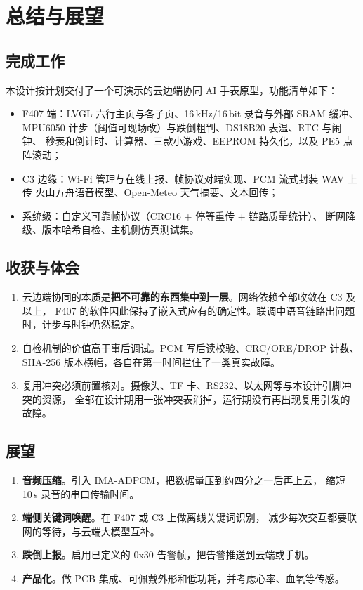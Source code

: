 \section{总结与展望}

\subsection{完成工作}
本设计按计划交付了一个可演示的云边端协同 AI 手表原型，功能清单如下：
\begin{itemize}
  \item F407 端：LVGL 六行主页与各子页、16\,kHz/16\,bit 录音与外部 SRAM 缓冲、
        MPU6050 计步（阈值可现场改）与跌倒粗判、DS18B20 表温、RTC 与闹钟、
        秒表和倒计时、计算器、三款小游戏、EEPROM 持久化，以及 PE5 点阵滚动；
  \item C3 边缘：Wi-Fi 管理与在线上报、帧协议对端实现、PCM 流式封装 WAV 上传
        火山方舟语音模型、Open-Meteo 天气摘要、文本回传；
  \item 系统级：自定义可靠帧协议（CRC16 + 停等重传 + 链路质量统计）、
        断网降级、版本哈希自检、主机侧仿真测试集。
\end{itemize}


\subsection{收获与体会}
\begin{enumerate}[label=（\arabic*）]
\item 云边端协同的本质是\textbf{把不可靠的东西集中到一层}。网络依赖全部收敛在 C3 及以上，
F407 的软件因此保持了嵌入式应有的确定性。联调中语音链路出问题时，计步与时钟仍然稳定。
\item 自检机制的价值高于事后调试。PCM 写后读校验、CRC/ORE/DROP 计数、
SHA-256 版本横幅，各自在第一时间拦住了一类真实故障。
\item 复用冲突必须前置核对。摄像头、TF 卡、RS232、以太网等与本设计引脚冲突的资源，
全部在设计期用一张冲突表消掉，运行期没有再出现复用引发的故障。
\end{enumerate}

\subsection{展望}
\begin{enumerate}[label=（\arabic*）]
\item \textbf{音频压缩}。引入 IMA-ADPCM，把数据量压到约四分之一后再上云，
缩短 10\,s 录音的串口传输时间。
\item \textbf{端侧关键词唤醒}。在 F407 或 C3 上做离线关键词识别，
减少每次交互都要联网的等待，与云端大模型互补。
\item \textbf{跌倒上报}。启用已定义的 0x30 告警帧，把告警推送到云端或手机。
\item \textbf{产品化}。做 PCB 集成、可佩戴外形和低功耗，并考虑心率、血氧等传感。
\end{enumerate}
